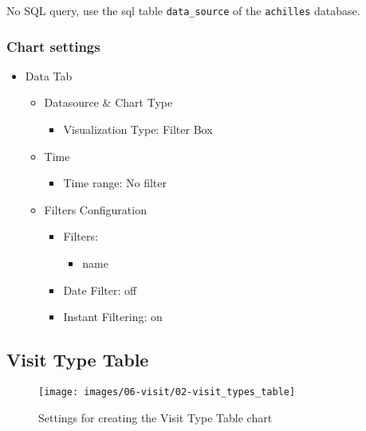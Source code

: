 \documentclass[
]{book}
\providecommand{\tightlist}{%
  \setlength{\itemsep}{0pt}\setlength{\parskip}{0pt}}
\begin{document}
No SQL query, use the sql table \texttt{data\_source} of the \texttt{achilles} database.

\hypertarget{chart-settings-16}{%
\subsubsection*{Chart settings}\label{chart-settings-16}}

\begin{itemize}
\tightlist
\item
  Data Tab

  \begin{itemize}
  \tightlist
  \item
    Datasource \& Chart Type

    \begin{itemize}
    \tightlist
    \item
      Visualization Type: Filter Box
    \end{itemize}
  \item
    Time

    \begin{itemize}
    \tightlist
    \item
      Time range: No filter
    \end{itemize}
  \item
    Filters Configuration

    \begin{itemize}
    \tightlist
    \item
      Filters:

      \begin{itemize}
      \tightlist
      \item
        name
      \end{itemize}
    \item
      Date Filter: off
    \item
      Instant Filtering: on
    \end{itemize}
  \end{itemize}
\end{itemize}

\hypertarget{visitTypeTable}{%
\subsection*{Visit Type Table}\label{visitTypeTable}}

\begin{figure}
\texttt{[image: images/06-visit/02-visit\_types\_table]} \caption{Settings for creating the Visit Type Table chart}\label{fig:visitTypeTable}
\end{figure}
\end{document}
